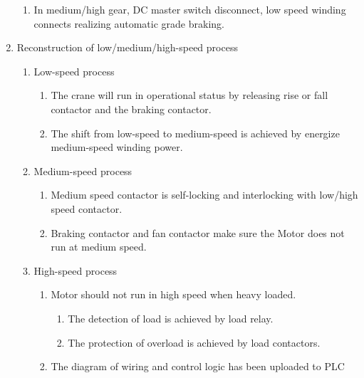 \documentclass[a4paper,10.5pt]{article}
\begin{document}
\begin{enumerate}
\begin{enumerate}
\item In medium/high gear, DC master switch disconnect, low speed winding connects realizing automatic grade braking.
	\end{enumerate} 
\item Reconstruction of low/medium/high-speed process
	\begin{enumerate}
\item Low-speed process
		\begin{enumerate}
\item The crane will run in operational status by releasing rise or fall  contactor and the braking contactor.
\item The shift from low-speed to medium-speed is achieved by energize medium-speed winding power.
		\end{enumerate}
\item Medium-speed process
	\begin{enumerate}
\item Medium speed contactor is self-locking and  interlocking with  low/high speed contactor.
\item Braking contactor and fan contactor make sure the Motor does not run at medium speed.
	\end{enumerate}
\item High-speed process
	\begin{enumerate}
\item Motor should not run in high speed when heavy loaded.
	\begin{enumerate}
\item The detection of load is achieved  by load relay.
\item The protection of overload is achieved by load contactors.
	\end{enumerate}
\item The diagram of wiring and control logic has been uploaded to PLC 
	\end{enumerate} 
	\end{enumerate}
	\end{enumerate}
\end{document}
